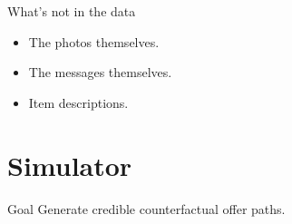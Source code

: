 \documentclass{beamer}
\begin{document}
\begin{frame}{What's not in the data}
	\begin{itemize}
		\item The photos themselves.
		\item The messages themselves.
		\item Item descriptions.
	\end{itemize}
\end{frame}

\begin{frame}
	\begin{figure}
		\centering
		\texttt{[image: \\detokenize\{w2v/w2v\_meta.png]}}
	\end{figure}
\end{frame}


\section{Simulator}\label{sec:simulator}

\begin{frame}{Goal}
	Generate credible counterfactual offer paths.
\end{frame}
\end{document}

